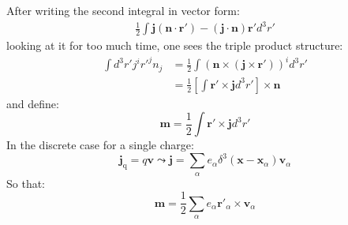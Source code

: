 \documentclass[12pt,a4]{article}
\begin{document}
\begin{enumerate}
\begin{enumerate}
      After writing the second integral in vector form:
      \begin{align*}
        \frac{1}{2}\int \mathbf{j}  (\mathbf{n}\cdot \mathbf{r'}) - (\mathbf{j}\cdot \mathbf{n})\mathbf{r'} d^3r'
      \end{align*}
      looking at it for too much time, one sees the triple product structure:
      \begin{align*}
        \int d^3r' j^i {r'}^j n_j &= \frac{1}{2}\int (\mathbf{n} \times (\mathbf{j} \times \mathbf{r}'))^i d^3r'\\
                                  &= \frac{1}{2}\left[\int \mathbf{r}' \times \mathbf{j}d^3r' \right]\times \mathbf{n}
      \end{align*}
      and define:
      \begin{equation*}
         \mathbf{m} = \frac{1}{2}\int \mathbf{r}' \times \mathbf{j}d^3r'
      \end{equation*}
      In the discrete case for a single charge:
      \begin{equation*}
        \mathbf{j}_{\text{q}} = q \mathbf{v} \leadsto \mathbf{j} = \sum_\alpha e_\alpha \delta^{3}(\mathbf{x} - \mathbf{x}_\alpha)\mathbf{v}_\alpha
      \end{equation*}
      So that:
      \begin{equation*}
         \mathbf{m} = \frac{1}{2}\sum_\alpha e_\alpha\mathbf{r}'_\alpha \times \mathbf{v}_\alpha
      \end{equation*}


\end{enumerate}
\end{enumerate}
\end{document}
